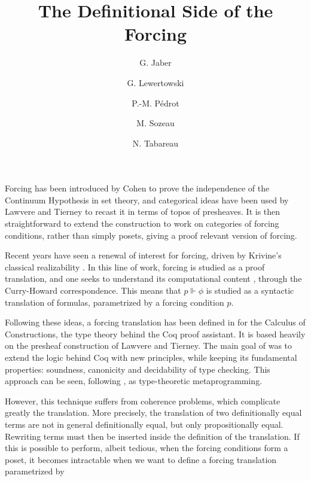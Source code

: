 \documentclass{easychair}
\author{G. Jaber\inst{1} \and G. Lewertowski\inst{1} \and P.-M. P\'edrot\inst{2} \and M. Sozeau\inst{1} \and N. Tabareau\inst{2}}
\title{The Definitional Side of the Forcing}
\institute {
IRIF - Universit\'e Paris Diderot / $\pi r^2$ - Inria
\and
Inria Rennes - Bretagne Atlantique
}
\begin{document}
\maketitle

  Forcing has been introduced by Cohen to prove the independence of the 
  Continuum Hypothesis in set theory, and 
  categorical ideas have been used by Lawvere and Tierney \cite{Tierney72} to recast it in terms of topos of presheaves. 
  It is then straightforward to extend the construction to work on categories of forcing conditions, rather than simply posets, giving a proof relevant version of forcing.
  \par
  Recent years have seen a renewal of interest
  for forcing, driven by Krivine's classical realizability \cite{Krivine09}. In this line of work, forcing is studied as a
  proof translation, and one seeks to understand its computational content \cite{Miquel11,Brunel14}, through the Curry-Howard correspondence.
  This means that $p \Vdash  \phi $ is studied  as a syntactic translation of formulas, parametrized by a forcing condition $p$.
  \par
  Following these ideas, a forcing translation has been defined in \cite{Jaber12} for the Calculus of Constructions, the type theory behind
  the Coq proof assistant.
  It is based heavily on the presheaf construction of Lawvere and Tierney.
  The main goal of \cite{Jaber12} was to extend the logic behind Coq with new principles, while keeping its fundamental properties: soundness, canonicity and decidability of type checking.
  This approach can be seen, following \cite{Altenkirch16}, as type-theoretic metaprogramming.
  \par
  However, this technique suffers from coherence problems, which complicate greatly the translation. More precisely, the translation of two definitionally equal terms are not 
  in general definitionally equal, but only propositionally equal. Rewriting terms must then be inserted inside the definition of the translation.
  If this is possible to perform, albeit tedious, when the forcing conditions form a poset, it becomes intractable when we want to define a forcing translation parametrized by
\end{document}
